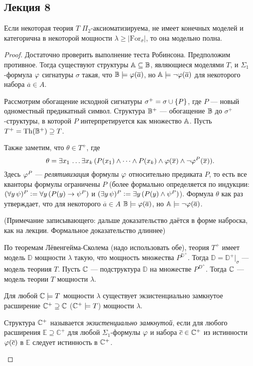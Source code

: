 \subsection{Лекция 8}

\begin{stat}
    Если некоторая теория $T$ $\Pi_2$-аксиоматизируема, не имеет конечных моделей и категорична в некоторой мощности $\lambda\ge|\text{For}_\sigma|$, то она модельно полна.
\end{stat}

\begin{proof}
    Достаточно проверить выполнение теста Робинсона. Предположим противное. Тогда существуют структуры $\ba\subseteq\bb$, являющиеся моделями $T$, и $\Sigma_1$-формула $\vfi$ сигнатуры $\sigma$ такая, что $\bb\models\vfi(\overline{a})$, но $\ba\models\neg\vfi(\overline{a})$ для некоторого набора $\overline{a}\in A$.

    Рассмотрим обогащение исходной сигнатуры $\sigma^+ = \sigma\cup\set*{P}$, где $P$ — новый одноместный предикатный символ. Структура $\bb^+$ — обогащение $\bb$ до $\sigma^+$-структуры, в которой $P$ интерпретируется как множество $\ba$. Пусть $T^+ = \text{Th}(\bb^+) \supseteq T$.

    Также заметим, что $\theta\in T^+$, где
    $$
    \theta = \exists x_1\, \dots \exists x_k\, (P(x_1)\wedge\dots\wedge P(x_k)\wedge\vfi(\overline{x})\wedge\neg\vfi^P(\overline{x})).
    $$
    Здесь $\vfi^P$ — \emph{релятивизация} формулы $\vfi$ относительно предиката $P$, то есть все кванторы формулы ограничены $P$ (более формально определяется по индукции: $(\forall y\,\psi)^P\defeq \forall y\, (P(y)\to\psi^P)$ и $(\exists y\,\psi)^P\defeq \exists y\,(P(y)\wedge \psi^P)$). Формула $\theta$ как раз утверждает, что для некоторого $\overline{a}\in A$ $\bb\models\vfi(\overline{a})$, но $\ba\models\neg\vfi(\overline{a})$.

    (Примечание записывающего: дальше доказательство даётся в форме наброска, как на лекции. Формальное доказательство длиннее)

    По теоремам Лёвенгейма-Сколема (надо использовать обе), теория $T^+$ имеет модель $\mathbb{D}$ мощности $\lambda$ такую, что мощность множества $P^{\mathbb{D}^+}$. Тогда $\mathbb{D} = \mathbb{D}^+|_\sigma$ — модель теориия $T$. Пусть $\bc$ — подструктура $\mathbb{D}$ на множестве $P^{D^+}$. Тогда $\bc$ — модель теории $T$ мощности $\lambda$.

    \begin{stat}
        Для любой $\bc\models T$ мощности $\lambda$ существует экзистенциально замкнутое расширение $\bc^+\supseteq\bc$ ($\bc^+\models T$) мощности $\lambda$.
    \end{stat}
    \begin{definition}
        Структура $\bc^+$ называется \emph{экзистенциально замкнутой}, если для любого расширения $\mathbb{E}\supseteq\mathbb{C}^+$ для любой $\Sigma_1$-формулы $\vfi$ и набора $\overline{c}\in \bc^+$ из истинности $\vfi(\overline{c})$ в $\mathbb{E}$ следует истинность в $\bc^+$.
    \end{definition}


\end{proof}
